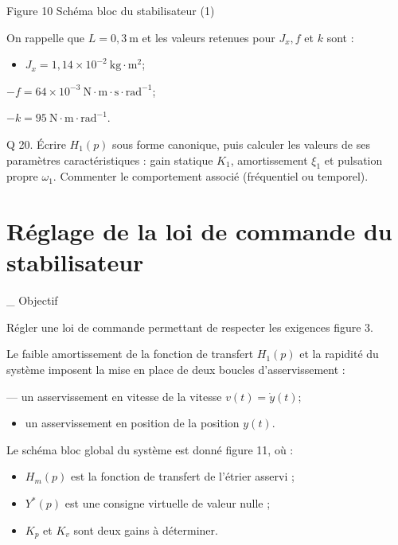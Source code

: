 \documentclass[10pt]{article}
\begin{document}
Figure 10 Schéma bloc du stabilisateur (1)

On rappelle que $L=0,3 \mathrm{~m}$ et les valeurs retenues pour $J_{x}, f$ et $k$ sont :

\begin{itemize}
  \item $J_{x}=1,14 \times 10^{-2} \mathrm{~kg} \cdot \mathrm{m}^{2}$;
\end{itemize}

$-f=64 \times 10^{-3} \mathrm{~N} \cdot \mathrm{m} \cdot \mathrm{s} \cdot \mathrm{rad}^{-1}$;

$-k=95 \mathrm{~N} \cdot \mathrm{m} \cdot \mathrm{rad}^{-1}$.

Q 20. Écrire $H_{1}(p)$ sous forme canonique, puis calculer les valeurs de ses paramètres caractéristiques : gain statique $K_{1}$, amortissement $\xi_{1}$ et pulsation propre $\omega_{1}$. Commenter le comportement associé (fréquentiel ou temporel).

\section{Réglage de la loi de commande du stabilisateur}
\_ Objectif

Régler une loi de commande permettant de respecter les exigences figure 3.

Le faible amortissement de la fonction de transfert $H_{1}(p)$ et la rapidité du système imposent la mise en place de deux boucles d'asservissement :

— un asservissement en vitesse de la vitesse $v(t)=\dot{y}(t)$;

\begin{itemize}
  \item un asservissement en position de la position $y(t)$.
\end{itemize}

Le schéma bloc global du système est donné figure 11, où :

\begin{itemize}
  \item $H_{m}(p)$ est la fonction de transfert de l'étrier asservi ;

  \item $Y^{*}(p)$ est une consigne virtuelle de valeur nulle ;

  \item $K_{p}$ et $K_{v}$ sont deux gains à déterminer.

\end{itemize}
\end{document}

